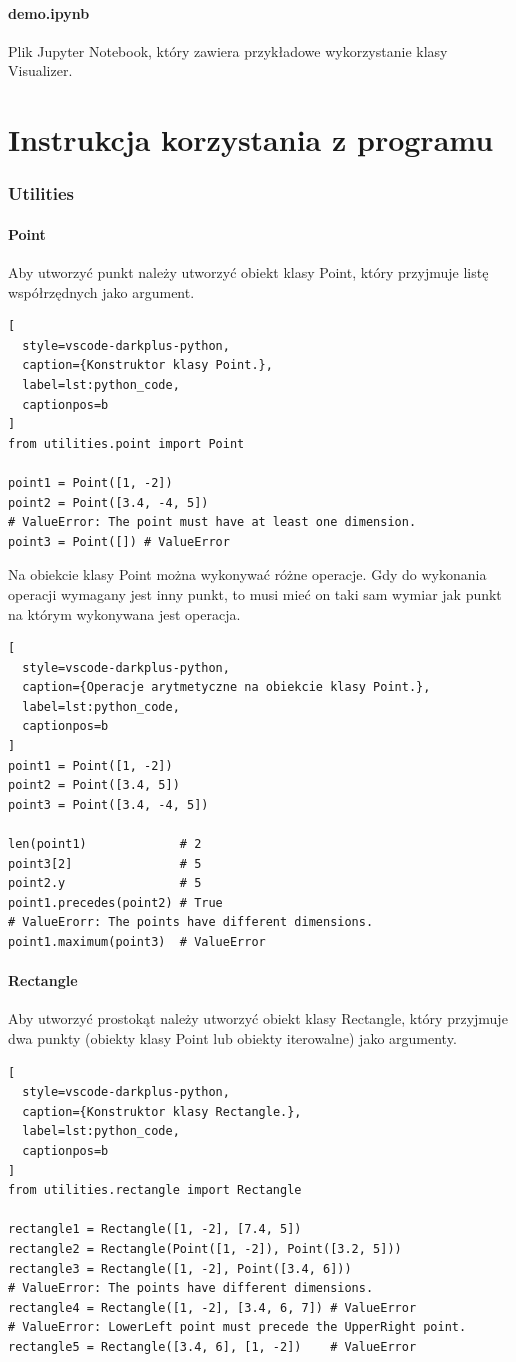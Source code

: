 \documentclass{lab}
\begin{document}
\subsection{demo.ipynb}
Plik Jupyter Notebook, który zawiera przykładowe wykorzystanie klasy Visualizer.

\part{Instrukcja korzystania z programu}
\section{Utilities}
\subsection{Point}
Aby utworzyć punkt należy utworzyć obiekt klasy Point, który przyjmuje listę współrzędnych jako argument.
\begin{lstlisting}[
  style=vscode-darkplus-python,
  caption={Konstruktor klasy Point.},
  label=lst:python_code,
  captionpos=b
]
from utilities.point import Point

point1 = Point([1, -2])
point2 = Point([3.4, -4, 5])
# ValueError: The point must have at least one dimension.
point3 = Point([]) # ValueError
\end{lstlisting}
Na obiekcie klasy Point można wykonywać różne operacje. Gdy do wykonania operacji wymagany jest inny punkt, to musi mieć on taki sam wymiar jak punkt na którym wykonywana jest operacja.
\begin{lstlisting}[
  style=vscode-darkplus-python,
  caption={Operacje arytmetyczne na obiekcie klasy Point.},
  label=lst:python_code,
  captionpos=b
]
point1 = Point([1, -2])
point2 = Point([3.4, 5])
point3 = Point([3.4, -4, 5])

len(point1)             # 2
point3[2]               # 5
point2.y                # 5
point1.precedes(point2) # True
# ValueErorr: The points have different dimensions.
point1.maximum(point3)  # ValueError
\end{lstlisting}

\subsection{Rectangle}
Aby utworzyć prostokąt należy utworzyć obiekt klasy Rectangle, który przyjmuje dwa punkty (obiekty klasy Point lub obiekty iterowalne) jako argumenty.
\begin{lstlisting}[
  style=vscode-darkplus-python,
  caption={Konstruktor klasy Rectangle.},
  label=lst:python_code,
  captionpos=b
]
from utilities.rectangle import Rectangle

rectangle1 = Rectangle([1, -2], [7.4, 5])
rectangle2 = Rectangle(Point([1, -2]), Point([3.2, 5]))
rectangle3 = Rectangle([1, -2], Point([3.4, 6]))
# ValueError: The points have different dimensions.
rectangle4 = Rectangle([1, -2], [3.4, 6, 7]) # ValueError
# ValueError: LowerLeft point must precede the UpperRight point.
rectangle5 = Rectangle([3.4, 6], [1, -2])    # ValueError
\end{lstlisting}
\end{document}

